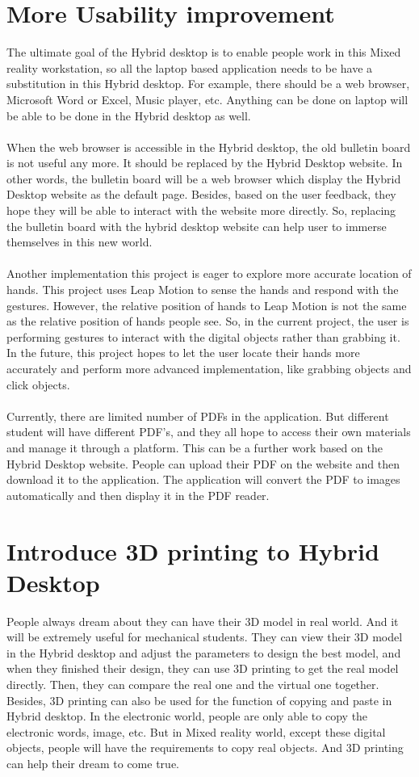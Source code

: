 \section{More Usability improvement}
The ultimate goal of the Hybrid desktop is to enable people work in this Mixed reality workstation, so all the laptop based application needs to be have a substitution in this Hybrid desktop. For example, there should be a web browser, Microsoft Word or Excel, Music player, etc. Anything can be done on laptop will be able to be done in the Hybrid desktop as well. 
\\
\\
When the web browser is accessible in the Hybrid desktop, the old bulletin board is not useful any more. It should be replaced by the Hybrid Desktop website. In other words, the bulletin board will be a web browser which display the Hybrid Desktop website as the default page. Besides, based on the user feedback, they hope they will be able to interact with the website more directly. So, replacing the bulletin board with the hybrid desktop website can help user to immerse themselves in this new world.
\\
\\
Another implementation this project is eager to explore more accurate location of hands. This project uses Leap Motion to sense the hands and respond with the gestures. However, the relative position of hands to Leap Motion is not the same as the relative position of hands people see. So, in the current project, the user is performing gestures to interact with the digital objects rather than grabbing it. In the future, this project hopes to let the user locate their hands more accurately and perform more advanced implementation, like grabbing objects and click objects.
\\
\\
Currently, there are limited number of PDFs in the application. But different student will have different PDF’s, and they all hope to access their own materials and manage it through a platform. This can be a further work based on the Hybrid Desktop website. People can upload their PDF on the website and then download it to the application. The application will convert the PDF to images automatically and then display it in the PDF reader.


\section{Introduce 3D printing to Hybrid Desktop}
People always dream about they can have their 3D model in real world. And it will be extremely useful for mechanical students. They can view their 3D model in the Hybrid desktop and adjust the parameters to design the best model, and when they finished their design, they can use 3D printing to get the real model directly. Then, they can compare the real one and the virtual one together. Besides, 3D printing can also be used for the function of copying and paste in Hybrid desktop. In the electronic world, people are only able to copy the electronic words, image, etc. But in Mixed reality world, except these digital objects, people will have the requirements to copy real objects. And 3D printing can help their dream to come true.

